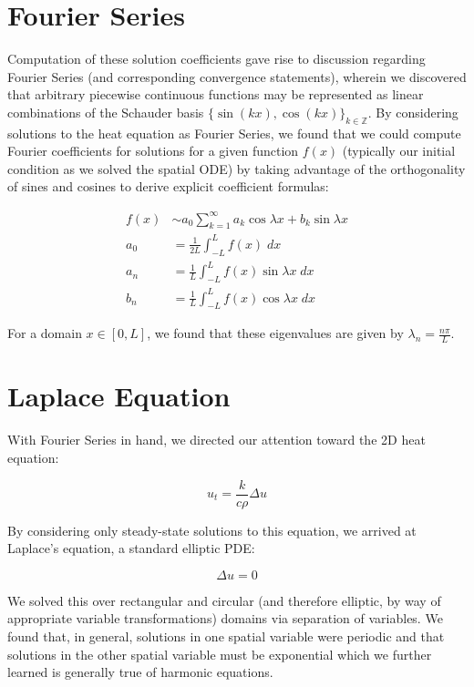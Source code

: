 \documentclass[letterpaper,10pt]{article}
\begin{document}
    \section{Fourier Series}\label{sec:fourier series}
    Computation of these solution coefficients gave rise to discussion regarding Fourier Series 
    (and corresponding convergence statements), wherein we discovered that arbitrary piecewise continuous functions may 
    be represented as linear combinations of the Schauder basis $\{\sin{(kx)}, \cos{(kx)} \}_{k \in \mathbb{Z}}$. By
    considering solutions to the heat equation as Fourier Series, we found that we could compute Fourier coefficients
    for solutions for a given function $f(x)$ (typically our initial condition as we solved the spatial ODE) by taking 
    advantage of the orthogonality of sines and cosines to derive explicit coefficient formulas:

    \begin{align*}
        f(x) &\sim a_0 \sum\limits_{k=1}^{\infty}{a_k \cos{\lambda x} + b_k \sin{\lambda x}} \\
        a_0 &= \frac{1}{2L} \int_{-L}^{L}{f(x)\; dx} \\
        a_n &= \frac{1}{L} \int_{-L}^{L}{f(x) \sin{\lambda x}\; dx} \\
        b_n &= \frac{1}{L} \int_{-L}^{L}{f(x) \cos{\lambda x}\; dx}
    \end{align*}

    For a domain $x \in [0, L]$, we found that these eigenvalues are given by $\lambda_n = \frac{n \pi}{L}$.

    \section{Laplace Equation}\label{sec:laplace-equation}
    With Fourier Series in hand, we directed our attention toward the 2D heat equation:

    $$
    u_t = \frac{k}{c \rho} \Delta u
    $$

    By considering only steady-state solutions to this equation, we arrived at Laplace's equation, a standard elliptic
    PDE:

    $$
    \Delta u = 0
    $$

    We solved this over rectangular and circular (and therefore elliptic, by way of appropriate variable 
    transformations) domains via separation of variables. We found that, in general, solutions in one spatial variable
    were periodic and that solutions in the other spatial variable must be exponential which we further learned is 
    generally true of harmonic equations.
\end{document}
